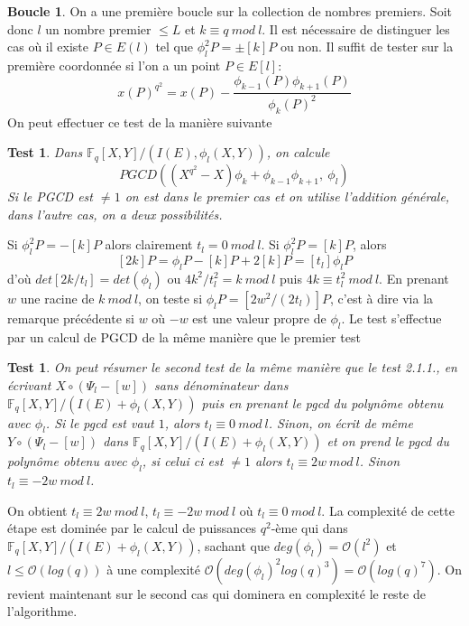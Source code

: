 \documentclass{article}
\theoremstyle{definition}
\newtheorem{boucle}[subsection]{Boucle}
\theoremstyle{plain}
\newtheorem{test}[subsubsection]{Test}
\begin{document}
\begin{boucle}
 On a une première boucle sur la collection de nombres premiers. Soit donc $l$ un nombre premier $\leq L$ et $k\equiv q~mod~l$. Il est nécessaire de distinguer les cas où il existe $P\in E(l)$ tel que $\phi_l^2P=\pm [k]P$ ou non. Il suffit de tester sur la première coordonnée si l'on a un point $P\in E[l]$: $$x(P)^{q^2}=x(P)-\frac{\phi_{k-1}(P)\phi_{k+1}(P)}{\phi_{k}(P)^2}$$
On peut effectuer ce test de la manière suivante
\begin{test}
Dans $\mathbb{F}_q[X,Y]/(I(E),\phi_l(X,Y))$, on calcule $$PGCD((X^{q^2}-X)\phi_k+\phi_{k-1}\phi_{k+1},~\phi_l)$$  Si le PGCD est $\ne 1$ on est dans le premier cas et on utilise l'addition générale, dans l'autre cas, on a deux possibilités.
\end{test} Si $\phi_l^2P=-[k]P$ alors clairement $t_l=0~mod~l$. Si $\phi_l^2P=[k]P$, alors $$[2k]P=\phi_lP-[k]P+2[k]P=[t_l]\phi_lP$$ d'où $det[2k/t_l]=det(\phi_l)$ ou $4k^2/t_l^2=k~mod~l$ puis $4k\equiv t_l^2~mod~l$. En prenant $w$ une racine de $k~mod~l$, on teste si $\phi_lP=[2w^2/(2t_l)]P$, c'est à dire via la remarque précédente si $w$ où $-w$ est une valeur propre de $\phi_l$. Le test s'effectue par un calcul de PGCD de la même manière que le premier test \begin{test}
    On peut résumer le second test de la même manière que le test 2.1.1., en écrivant $X\circ(\Psi_l-[w])$ sans dénominateur dans $\mathbb{F}_q[X,Y]/(I(E)+\phi_l(X,Y))$ puis en prenant le pgcd du polynôme obtenu avec $\phi_l$. Si le pgcd est vaut $1$, alors  $t_l\equiv0~mod~l$. Sinon, on écrit de même $Y\circ(\Psi_l-[w])$ dans $\mathbb{F}_q[X,Y]/(I(E)+\phi_l(X,Y))$ et on prend le pgcd du polynôme obtenu avec $\phi_l$, si celui ci est $\ne1$ alors $t_l\equiv 2w~mod~l$. Sinon $t_l\equiv -2w~mod~l$.
\end{test}
On obtient $t_l\equiv2w~mod~l$, $t_l\equiv-2w~mod~l$ où $t_l\equiv0~mod~l$. La complexité de cette étape est dominée par le calcul de puissances $q^2$-ème qui dans $\mathbb{F}_q[X,Y]/(I(E)+\phi_l(X,Y))$, sachant que $deg(\phi_l)=\mathcal{O}(l^2)$ et $l\leq\mathcal{O}(log(q))$ à une complexité $\mathcal{O}(deg(\phi_l)^2log(q)^3)=\mathcal{O}(log(q)^7)$. 
On revient maintenant sur le second cas qui dominera en complexité le reste de l'algorithme.\\
\end{boucle}
\end{document}
